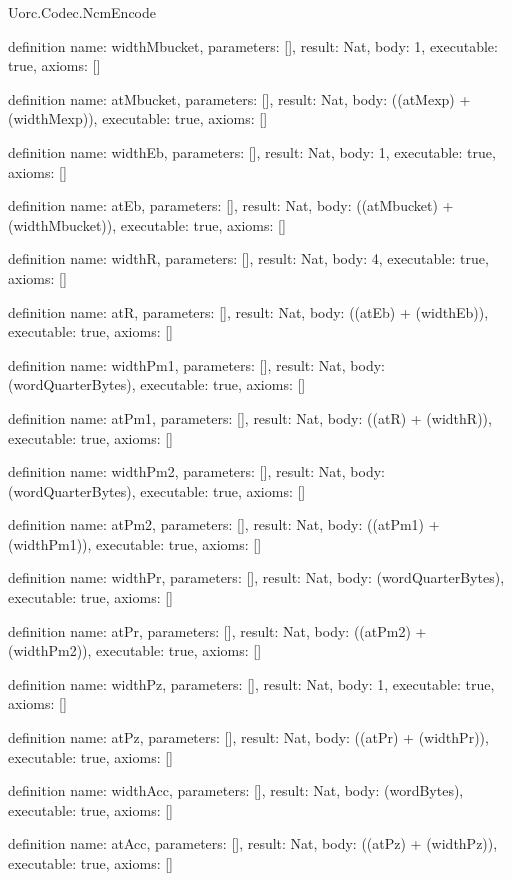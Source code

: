 \begin{lexlean}{Uorc.Codec.NcmEncode}
\begin{semanticmodule}
definition{
  name: widthMbucket,
  parameters: [],
  result: Nat,
  body: 1,
  executable: true,
  axioms: []
}

definition{
  name: atMbucket,
  parameters: [],
  result: Nat,
  body: ((atMexp) + (widthMexp)),
  executable: true,
  axioms: []
}

definition{
  name: widthEb,
  parameters: [],
  result: Nat,
  body: 1,
  executable: true,
  axioms: []
}

definition{
  name: atEb,
  parameters: [],
  result: Nat,
  body: ((atMbucket) + (widthMbucket)),
  executable: true,
  axioms: []
}

definition{
  name: widthR,
  parameters: [],
  result: Nat,
  body: 4,
  executable: true,
  axioms: []
}

definition{
  name: atR,
  parameters: [],
  result: Nat,
  body: ((atEb) + (widthEb)),
  executable: true,
  axioms: []
}

definition{
  name: widthPm1,
  parameters: [],
  result: Nat,
  body: (wordQuarterBytes),
  executable: true,
  axioms: []
}

definition{
  name: atPm1,
  parameters: [],
  result: Nat,
  body: ((atR) + (widthR)),
  executable: true,
  axioms: []
}

definition{
  name: widthPm2,
  parameters: [],
  result: Nat,
  body: (wordQuarterBytes),
  executable: true,
  axioms: []
}

definition{
  name: atPm2,
  parameters: [],
  result: Nat,
  body: ((atPm1) + (widthPm1)),
  executable: true,
  axioms: []
}

definition{
  name: widthPr,
  parameters: [],
  result: Nat,
  body: (wordQuarterBytes),
  executable: true,
  axioms: []
}

definition{
  name: atPr,
  parameters: [],
  result: Nat,
  body: ((atPm2) + (widthPm2)),
  executable: true,
  axioms: []
}

definition{
  name: widthPz,
  parameters: [],
  result: Nat,
  body: 1,
  executable: true,
  axioms: []
}

definition{
  name: atPz,
  parameters: [],
  result: Nat,
  body: ((atPr) + (widthPr)),
  executable: true,
  axioms: []
}

definition{
  name: widthAcc,
  parameters: [],
  result: Nat,
  body: (wordBytes),
  executable: true,
  axioms: []
}

definition{
  name: atAcc,
  parameters: [],
  result: Nat,
  body: ((atPz) + (widthPz)),
  executable: true,
  axioms: []
}


\end{semanticmodule}
\end{lexlean}

